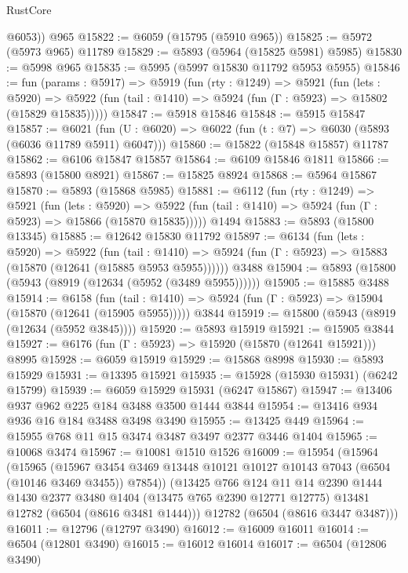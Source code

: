\begin{lexlean}{RustCore}
\begin{coremodule}
        @6053))
    @965
@15822 := @6059 (@15795 (@5910 @965))
@15825 := @5972 (@5973 @965) @11789
@15829 := @5893 (@5964 (@15825 @5981) @5985)
@15830 := @5998 @965
@15835 := @5995 (@5997 @15830 @11792 @5953 @5955)
@15846 := fun (params : @5917) =>
  @5919
    (fun (rty : @1249) =>
    @5921
      (fun (lets : @5920) =>
      @5922 (fun (tail : @1410) => @5924 (fun (Γ : @5923) => @15802 (@15829 @15835)))))
@15847 := @5918 @15846
@15848 := @5915 @15847
@15857 := @6021
    (fun (U : @6020) => @6022 (fun (t : @7) => @6030 (@5893 (@6036 @11789 @5911) @6047)))
@15860 := @15822 (@15848 @15857) @11787
@15862 := @6106 @15847 @15857
@15864 := @6109 @15846 @1811
@15866 := @5893 (@15800 @8921)
@15867 := @15825 @8924
@15868 := @5964 @15867
@15870 := @5893 (@15868 @5985)
@15881 := @6112
    (fun (rty : @1249) =>
    @5921
      (fun (lets : @5920) =>
      @5922 (fun (tail : @1410) => @5924 (fun (Γ : @5923) => @15866 (@15870 @15835)))))
    @1494
@15883 := @5893 (@15800 @13345)
@15885 := @12642 @15830 @11792
@15897 := @6134
    (fun (lets : @5920) =>
    @5922
      (fun (tail : @1410) =>
      @5924 (fun (Γ : @5923) => @15883 (@15870 (@12641 (@15885 @5953 @5955))))))
    @3488
@15904 := @5893 (@15800 (@5943 (@8919 (@12634 (@5952 (@3489 @5955))))))
@15905 := @15885 @3488
@15914 := @6158
    (fun (tail : @1410) => @5924 (fun (Γ : @5923) => @15904 (@15870 (@12641 (@15905 @5955)))))
    @3844
@15919 := @15800 (@5943 (@8919 (@12634 (@5952 @3845))))
@15920 := @5893 @15919
@15921 := @15905 @3844
@15927 := @6176 (fun (Γ : @5923) => @15920 (@15870 (@12641 @15921))) @8995
@15928 := @6059 @15919
@15929 := @15868 @8998
@15930 := @5893 @15929
@15931 := @13395 @15921
@15935 := @15928 (@15930 @15931) (@6242 @15799)
@15939 := @6059 @15929 @15931 (@6247 @15867)
@15947 := @13406 @937 @962 @225 @184 @3488 @3500 @1444 @3844
@15954 := @13416 @934 @936 @16 @184 @3488 @3498 @3490
@15955 := @13425 @449
@15964 := @15955 @768 @11 @15 @3474 @3487 @3497 @2377 @3446 @1404
@15965 := @10068 @3474
@15967 := @10081 @1510 @1526
@16009 := @15954
    (@15964
      (@15965
        (@15967 @3454 @3469 @13448 @10121 @10127 @10143 @7043 (@6504 (@10146 @3469 @3455)) @7854))
      (@13425
        @766
        @124
        @11
        @14
        @2390
        @1444
        @1430
        @2377
        @3480
        @1404
        (@13475 @765 @2390 @12771 @12775)
        @13481
        @12782
        (@6504 (@8616 @3481 @1444)))
      @12782
      (@6504 (@8616 @3447 @3487)))
@16011 := @12796 (@12797 @3490)
@16012 := @16009 @16011
@16014 := @6504 (@12801 @3490)
@16015 := @16012 @16014
@16017 := @6504 (@12806 @3490)

\end{coremodule}
\end{lexlean}
